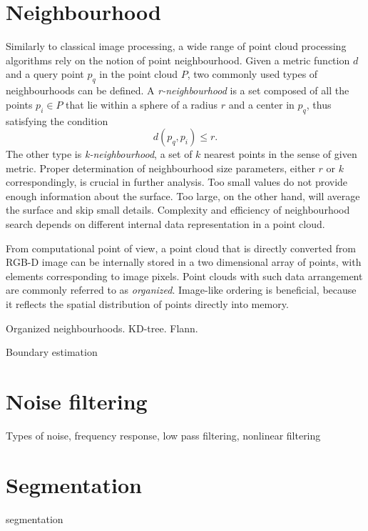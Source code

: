 
\section{Neighbourhood}
\label{sec:neighbourhood}

Similarly to classical image processing, a wide range of point cloud processing algorithms rely on the notion of point neighbourhood. Given a metric function $d$ and a query point $p_q$ in the point cloud $P$, two commonly used types of neighbourhoods can be defined. A \textit{r-neighbourhood} is a set composed of all the points $p_i \in P$ that lie within a sphere of a radius $r$ and a center in $p_q$, thus satisfying the condition
\begin{equation}
d(p_	q, p_i) \leq r.
\end{equation}
The other type is \textit{k-neighbourhood}, a set of $k$ nearest points in the sense of given metric. Proper determination of neighbourhood size parameters, either $r$ or $k$ correspondingly, is crucial in further analysis. Too small values do not provide enough information about the surface. Too large, on the other hand, will average the surface and skip small details. Complexity and efficiency of neighbourhood search depends on different internal data representation in a point cloud.

From computational point of view, a point cloud that is directly converted from RGB-D image can be internally stored in a two dimensional array of points, with elements corresponding to image pixels. Point clouds with such data arrangement are commonly referred to as \textit{organized}. Image-like ordering is beneficial, because it reflects the spatial distribution of points directly into memory.



Organized neighbourhoods.
KD-tree.
Flann.

Boundary estimation

\section{Noise filtering}
\label{sec:noise}

Types of noise, frequency response, low pass filtering, nonlinear filtering


\section{Segmentation}
\label{sec:segmentation}

segmentation

